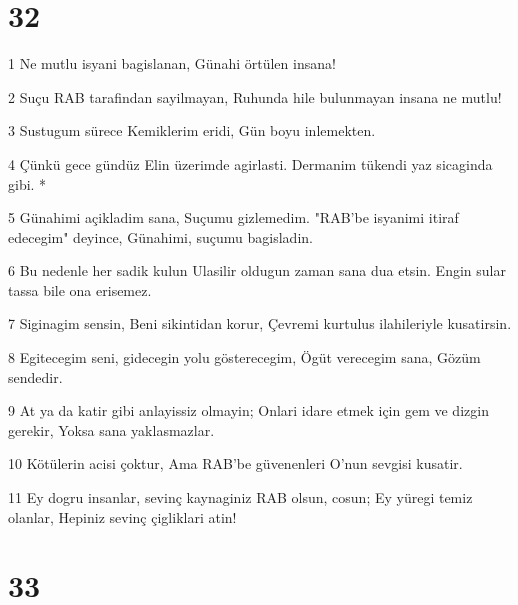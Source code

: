 \chapter{32}

\par 1 Ne mutlu isyani bagislanan, Günahi örtülen insana!
\par 2 Suçu RAB tarafindan sayilmayan, Ruhunda hile bulunmayan insana ne mutlu!
\par 3 Sustugum sürece Kemiklerim eridi, Gün boyu inlemekten.
\par 4 Çünkü gece gündüz Elin üzerimde agirlasti. Dermanim tükendi yaz sicaginda gibi. *
\par 5 Günahimi açikladim sana, Suçumu gizlemedim. "RAB'be isyanimi itiraf edecegim" deyince, Günahimi, suçumu bagisladin.
\par 6 Bu nedenle her sadik kulun Ulasilir oldugun zaman sana dua etsin. Engin sular tassa bile ona erisemez.
\par 7 Siginagim sensin, Beni sikintidan korur, Çevremi kurtulus ilahileriyle kusatirsin.
\par 8 Egitecegim seni, gidecegin yolu gösterecegim, Ögüt verecegim sana, Gözüm sendedir.
\par 9 At ya da katir gibi anlayissiz olmayin; Onlari idare etmek için gem ve dizgin gerekir, Yoksa sana yaklasmazlar.
\par 10 Kötülerin acisi çoktur, Ama RAB'be güvenenleri O'nun sevgisi kusatir.
\par 11 Ey dogru insanlar, sevinç kaynaginiz RAB olsun, cosun; Ey yüregi temiz olanlar, Hepiniz sevinç çigliklari atin!

\chapter{33}

